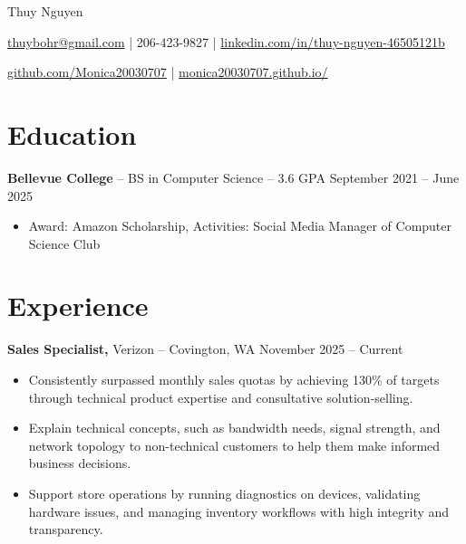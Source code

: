 \documentclass[11pt]{article}       %
\begin{document}
\centerline{\Huge Thuy Nguyen}

\vspace{5pt}

\centerline{\href{mailto:thuybohr@gmail.com}{thuybohr@gmail.com} | 206-423-9827 |
\href{https://www.linkedin.com/in/thuy-nguyen-46505121b/}{linkedin.com/in/thuy-nguyen-46505121b}}

\centerline{\href{https://github.com/Monica20030707}{github.com/Monica20030707} | 
\href{https://monica20030707.github.io/}{monica20030707.github.io/}} 

\vspace{-9pt}

\section*{Education}
\textbf{Bellevue College} -- BS in Computer Science -- 3.6 GPA \hfill September 2021 -- June 2025\\
\vspace{-9pt}
\begin{itemize}
  \item Award: Amazon Scholarship, Activities: Social Media Manager of Computer Science Club
\end{itemize}

\vspace{-18.5pt}

\section*{Experience}

\textbf{Sales Specialist,} {Verizon} -- Covington, WA \hfill November 2025 -- Current \\
\vspace{-9pt}
\begin{itemize}
  \item Consistently surpassed monthly sales quotas by achieving 130\% of targets through technical product expertise and consultative solution-selling.
  \item Explain technical concepts, such as bandwidth needs, signal strength, and network topology to non-technical customers to help them make informed business decisions.
  \item Support store operations by running diagnostics on devices, validating hardware issues, and managing inventory workflows with high integrity and transparency.
\end{itemize}
\end{document}
